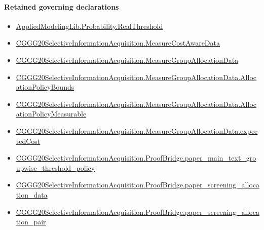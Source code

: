 \documentclass[10pt]{article}
\begin{document}
\paragraph{Retained governing declarations}
\begin{itemize}\raggedright
\item \hyperlink{governing-declaration-41082d9d716d6171}{Applied\allowbreak{}Modeling\allowbreak{}Lib.\allowbreak{}Probability.\allowbreak{}Real\allowbreak{}Threshold}
\item \hyperlink{governing-declaration-254893ae2d19bfc7}{CGGG20\allowbreak{}Selective\allowbreak{}Information\allowbreak{}Acquisition.\allowbreak{}Measure\allowbreak{}Cost\allowbreak{}Aware\allowbreak{}Data}
\item \hyperlink{governing-declaration-da82fc25816f69f3}{CGGG20\allowbreak{}Selective\allowbreak{}Information\allowbreak{}Acquisition.\allowbreak{}Measure\allowbreak{}Group\allowbreak{}Allocation\allowbreak{}Data}
\item \hyperlink{governing-declaration-d8405943feecc63e}{CGGG20\allowbreak{}Selective\allowbreak{}Information\allowbreak{}Acquisition.\allowbreak{}Measure\allowbreak{}Group\allowbreak{}Allocation\allowbreak{}Data.\allowbreak{}Allocation\allowbreak{}Policy\allowbreak{}Bounds}
\item \hyperlink{governing-declaration-bf11c1c6abaaf405}{CGGG20\allowbreak{}Selective\allowbreak{}Information\allowbreak{}Acquisition.\allowbreak{}Measure\allowbreak{}Group\allowbreak{}Allocation\allowbreak{}Data.\allowbreak{}Allocation\allowbreak{}Policy\allowbreak{}Measurable}
\item \hyperlink{governing-declaration-022cbd86b49721b2}{CGGG20\allowbreak{}Selective\allowbreak{}Information\allowbreak{}Acquisition.\allowbreak{}Measure\allowbreak{}Group\allowbreak{}Allocation\allowbreak{}Data.\allowbreak{}expected\allowbreak{}Cost}
\item \hyperlink{governing-declaration-d8e0d95bf9e8e6d9}{CGGG20\allowbreak{}Selective\allowbreak{}Information\allowbreak{}Acquisition.\allowbreak{}Proof\allowbreak{}Bridge.\allowbreak{}paper\_\allowbreak{}main\_\allowbreak{}text\_\allowbreak{}groupwise\_\allowbreak{}threshold\_\allowbreak{}policy}
\item \hyperlink{governing-declaration-aef8d61af2db4aea}{CGGG20\allowbreak{}Selective\allowbreak{}Information\allowbreak{}Acquisition.\allowbreak{}Proof\allowbreak{}Bridge.\allowbreak{}paper\_\allowbreak{}screening\_\allowbreak{}allocation\_\allowbreak{}data}
\item \hyperlink{governing-declaration-3473de6663e953e5}{CGGG20\allowbreak{}Selective\allowbreak{}Information\allowbreak{}Acquisition.\allowbreak{}Proof\allowbreak{}Bridge.\allowbreak{}paper\_\allowbreak{}screening\_\allowbreak{}allocation\_\allowbreak{}pair}

\end{itemize}
\end{document}
